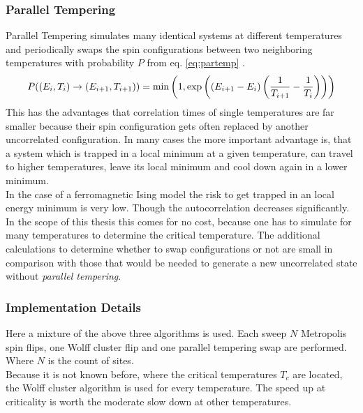     \subsubsection{Parallel Tempering}
        Parallel Tempering\cite{ParallelTempering1986} simulates many identical systems at different
        temperatures and periodically swaps the spin configurations
        between two neighboring temperatures with probability \(P\) from
        eq. \eqref{eq:partemp} \cite[p. 169ff]{NewmanBarkema1999} \cite[S. 155ff]{Katzgraber2011}.
        \begin{equation}
            P((E_i,T_i) \to (E_{i+1},T_{i+1})) = \min\left(1,\exp\left(\left(E_{i+1}-E_i\right)\left(\frac{1}{T_{i+1}}-\frac{1}{T_i}\right)\right)\right)
            \label{eq:partemp}
        \end{equation}
        This has the advantages that correlation times of single
        temperatures are far smaller because their spin configuration
        gets often replaced by another uncorrelated configuration. In
        many cases the more important advantage is, that a system which
        is trapped in a local minimum at a given temperature, can travel
        to higher temperatures, leave its local minimum and cool down
        again in a lower minimum.\\
        In the case of a ferromagnetic Ising model the risk to get trapped
        in an local energy minimum is very low. Though the autocorrelation
        decreases significantly. In the scope of this thesis this comes
        for no cost, because one has to simulate for many temperatures
        to determine the critical temperature. The additional calculations
        to determine whether to swap configurations or not are small in
        comparison with those that would be needed to generate a new
        uncorrelated state without \emph{parallel tempering}.

    \subsubsection{Implementation Details}
        Here a mixture of the above three algorithms is used.
        Each sweep \(N\) Metropolis spin flips, one Wolff cluster flip
        and one parallel tempering swap are performed. Where \(N\) is the
        count of sites.\\
        Because it is not known before, where the critical temperatures
        \(T_c\) are located, the Wolff cluster algorithm is used for
        every temperature. The speed up at criticality is worth the
        moderate slow down at other temperatures.

